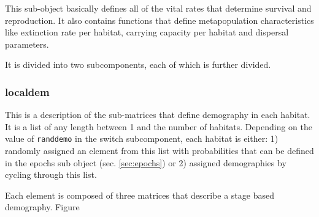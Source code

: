 \documentclass[10pt]{article}
\newcommand{\code}[1]{\texttt{#1}}
\begin{document}
This sub-object basically defines all of the vital rates that determine
survival and reproduction.  It also contains functions that define
metapopulation characteristics like extinction rate per habitat,
carrying capacity per habitat and dispersal parameters.

It is divided into two subcomponents, each of which is further
divided.

\subsubsection{localdem}
\label{sec:localdem}
This is a description of the sub-matrices that define demography in
each habitat.  It is a list of any length between 1 and the number of
habitats.  Depending on the value of \code{randdemo} in the switch
subcomponent, each habitat is either: 1) randomly assigned an element
from this list with probabilities that can be defined in the epochs
sub object (sec. \ref{sec:epochs}) or 2) assigned demographies by
cycling through this list.

Each element is composed of three matrices that describe a stage based
demography. Figure
\end{document}
